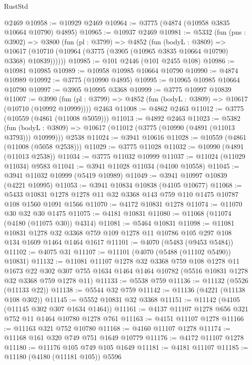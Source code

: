 \begin{lexlean}{RustStd}
\begin{coremodule}
{\begin{coremodule}
{{{{{{{{{{{{{{{{{{{{{{{{{{{{{{{    @2469
@10958 := @10929 @2469
@10964 := @3775 (@4874 (@10958 @3835 @10664 @10790) @4895)
@10965 := @10937 @2469
@10981 := @5332
    (fun (pns : @3902) =>
    @3800
      (fun (pl : @3799) =>
      @4852
        (fun (bodyL : @3809) =>
        @10617 (@10710 (@10964 (@3775 (@3905 (@10965 @3835 @10664 @10790) @3368) @10839))))))
@10985 := @101 @2446 (@101 @2455 @108)
@10986 := @10981 @10985
@10989 := @10958 @10985 @10664 @10790
@10990 := @4874 @10989
@10992 := @3775 (@10990 @4895)
@10995 := @10965 @10985 @10664 @10790
@10997 := @3905 @10995 @3368
@10999 := @3775 @10997 @10839
@11007 := @3990
    (fun (pl : @3799) => @4852 (fun (bodyL : @3809) => @10617 (@10710 (@10992 @10999))))
    @2463
@11008 := @4862 @2463
@11012 := @3775 (@10559 (@4861 (@11008 @5059)))
@11013 := @4892 @2463
@11023 := @5382
    (fun (bodyL : @3809) => @10617 (@11012 (@3775 (@10990 (@4891 (@11013 @3793))) @10999)))
    @2538
@11024 := @3941 @10616
@11028 := @10559 (@4861 (@11008 (@5058 @2538)))
@11029 := @3775 @11028
@11032 := @10990 (@4891 (@11013 @2538))
@11034 := @3775 @11032 @10999
@11037 := @11024 (@11029 @11034) @9583
@11041 := @3941 @11028 @11034 (@4100 @10558)
@11045 := @3941 @11032 @10999 (@5419 @10989)
@11049 := @3941 @10997 @10839 (@4221 @10995)
@11053 := @3941 @10834 @10838 (@4105 @10677)
@11068 := @5433 @10831 @1278 @1278 @11 @32 @3368 @143 @759 @110 @1475 @10787 @108 @1560 @1091 @1566
@11070 := @4172 @10831 @1278
@11074 := @11070 @30 @32 @30 @1475
@11075 := @4181 @10831
@11080 := @11068 (@11074 (@4180 (@11075 @30)) @4314)
@11081 := @5464 @10831
@11098 := @11081
    @10831
    @1278
    @32
    @3368
    @759
    @109
    @1278
    @11
    @10786
    @105
    @297
    @108
    @134
    @1609
    @1464
    @1464
    @1617
@11101 := @4070 (@5483 (@9453 @5484))
@11102 := @4075 @31
@11107 := @11101 (@4070 (@5488 (@11102 @5490)) @10831)
@11132 := @11081
    @11107
    @1278
    @32
    @3368
    @759
    @108
    @1278
    @11
    @1673
    @22
    @302
    @307
    @755
    @1634
    @1464
    @1464
    @10782
    (@5516 @10831 @1278 @32 @3368 @759 @1278 @11)
@11133 := @5538 @759
@11136 := @11132 (@5526 (@11133 @22))
@11138 := @5544 @32 @759
@11142 := @11136 (@4221 (@11138 @108 @302))
@11145 := @5552 @10831 @32 @3368
@11151 := @11142 (@4105 (@11145 @302 @307 @1634 @1464))
@11161 := @4137 @11107 @1278 @656 @321 @752 @11 @1464 @10780 @1278 @761
@11163 := @4151 @11107 @1278
@11166 := @11163 @321 @752 @10780
@11168 := @4160 @11107 @1278
@11174 := @11168 @161 @320 @749 @751 @1649 @10779
@11176 := @4172 @11107 @1278
@11180 := @11176 @105 @749 @105 @1649
@11181 := @4181 @11107
@11185 := @11180 (@4180 (@11181 @105)) @5596
}}}}}}}}}}}}}}}}}}}}}}}}}}}}}}}
\end{coremodule}}
\end{coremodule}
\end{lexlean}
